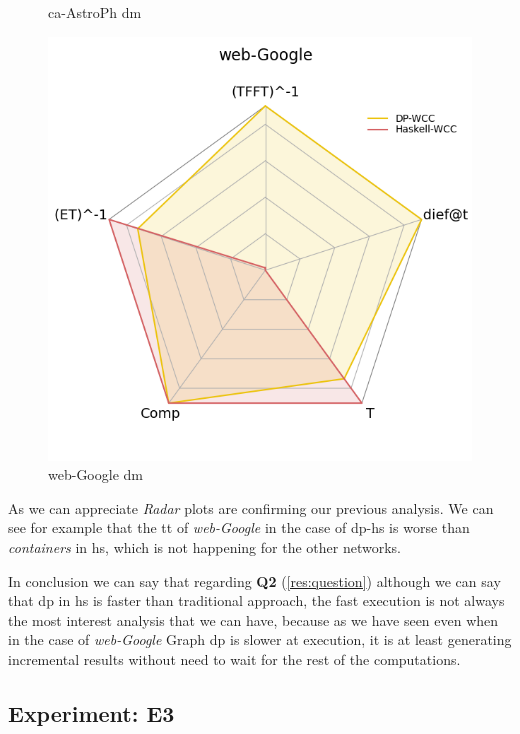 \documentclass[preprint]{elsarticle}
\begin{document}
\begin{figure}[!htb]
\begin{minipage}{0.33\textwidth}
      \caption{ca-AstroPh \acrshort{dm}}
      \label{fig:dief:rad:2}
    \end{minipage}%
    \begin{minipage}{0.33\textwidth}
     \includegraphics[width=1\linewidth, height=0.2\textheight]{web_google_radar}
      \caption{web-Google \acrshort{dm}}
      \label{fig:dief:rad:3}
    \end{minipage}
\end{figure}

As we can appreciate \emph{Radar} plots are confirming our previous analysis. We can see for example that the \acrshort{tt} of \emph{web-Google} in the case of \acrshort{dp}-\acrshort{hs} is worse than \emph{containers} in \acrshort{hs}, which is not happening for the other networks.

In conclusion we can say that regarding \textbf{Q2} (\autoref{res:question}) although we can say that \acrshort{dp} in \acrshort{hs} is faster than traditional approach, the fast execution is not always the most interest analysis that we can have, because as we have seen even when in the case of \emph{web-Google} Graph \acrshort{dp} is slower at execution, it is at least generating incremental results without need to wait for the rest of the computations.

\subsection{Experiment: E3}
\end{document}
